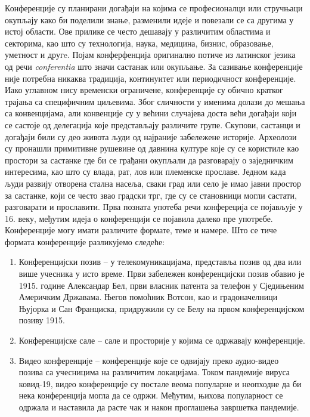 \documentclass[12pt]{article}
\begin{document}
Конференције су планирани догађаји на којима се професионалци или стручњаци окупљају како би поделили знање, разменили идеје и повезали се са другима у истој области. Ове прилике се често дешавају у различитим областима и секторима, као што су технологија, наука, медицина, бизнис, образовање, уметност и другe. Појам конферфенција оригинално потиче из латинског језика од речи \textit{conferentia} што значи састанак или окупљање. За сазивање конференције није потребна никаква традиција, континуитет или периодичност конференције. Иако углавном нису временски ограничене, конференције су обично кратког трајања
са специфичним циљевима. Због сличности у именима долази до мешања са конвенцијама, али конвенције су у већини случајева доста већи догађаји који се састоје од делегација које представљају различите групе.
Скупови, састанци и догађаји били су део живота људи од најраније забележене историје. Археолози су пронашли примитивне рушевине од давнина културе које су се користиле као простори за састанке где би се грађани окупљали да разговарају о заједничким интересима, као што су влада, рат, лов или племенске прославе. Једном када људи развију отворена стална насеља, сваки град или село је имао јавни простор за састанке, који се често звао градски трг, где су се становници могли састати, разговарати и прославити. Прва позната употеба речи конфереција се појављује у 16. веку, међутим идеја о конференцији се појавила далеко пре употребе. 
Конференције могу имати различите формате, теме и намере. Што се тиче формата конференције разликујемо следеће:
\begin{enumerate}
    \item Конференцијски позив – у телекомуникацијама, представља позив од два или више учесника у исто време. Први забележен конференцијски позив oбавио је 1915. године Александар Бел, први власник патента за телефон у Сједињеним Америчким Државама. Његов помоћник Вотсон, као и градоначелници Њујорка и Сан Франциска, придружили су се Белу на првом конференцијском позиву 1915.
    \item Конференцијске сале – сале и просторије у којима се одржавају конференције.
    \item Видео конференције – конференције које се одвијају преко аудио-видео позива са учесницима на различитим локацијама. Током пандемије вируса ковид-19, видео конференције су постале веома популарне и неопходне да би нека конференција могла да се одржи. Међутим, њихова популарност се одржала и наставила да расте чак и након проглашења завршетка пандемије.
\end{enumerate}
\end{document}
